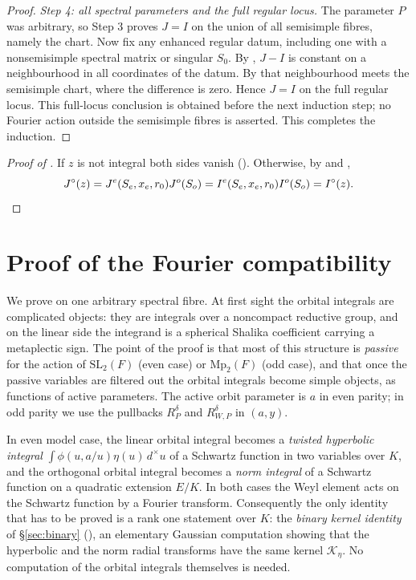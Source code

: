 \documentclass[11pt,oneside,notitlepage]{book}
\numberwithin{equation}{section}
\theoremstyle{plain}
\theoremstyle{definition}
\newcommand{\SL}{\mathrm{SL}}
\newcommand{\Mp}{\mathrm{Mp}}
\begin{document}
\begin{proof}
\emph{Step 4: all spectral parameters and the full regular locus.} The parameter $P$ was arbitrary, so Step 3 proves $J=I$ on the union of all semisimple fibres, namely the chart. Now fix any enhanced regular datum, including one with a nonsemisimple spectral matrix or singular $S_0$. By , $J-I$ is constant on a neighbourhood in all coordinates of the datum. By  that neighbourhood meets the semisimple chart, where the difference is zero. Hence $J=I$ on the full regular locus. This full-locus conclusion is obtained before the next induction step; no Fourier action outside the semisimple fibres is asserted. This completes the induction.
\end{proof}

\begin{proof}[Proof of ]
If $z$ is not integral both sides vanish (). Otherwise, by  and ,
\[J^\circ(z)=J^e(S_e,x_e,r_0)J^o(S_o)=I^e(S_e,x_e,r_0)I^o(S_o)=I^\circ(z).\qedhere\]
\end{proof}

\chapter{Proof of the Fourier compatibility}\label{ch:fourier}

We prove  on one arbitrary spectral fibre. At first sight the orbital integrals are complicated objects: they are integrals over a noncompact reductive group, and on the linear side the integrand is a spherical Shalika coefficient carrying a metaplectic sign. The point of the proof is that most of this structure is \emph{passive} for the action of $\SL_2(F)$ (even case) or $\Mp_2(F)$ (odd case), and that once the passive variables are filtered out the orbital integrals become simple objects, as functions of active parameters. The active orbit parameter is $a$ in even parity; in odd parity we use the pullbacks $R_P^\delta$ and $R_{W,P}^\delta$ in $(a,y)$. 

In even model case, the linear orbital integral becomes a \emph{twisted hyperbolic integral} $\int\phi(u,a/u)\eta(u)\,d^\times u$ of a Schwartz function in two variables over $K$, and the orthogonal orbital integral becomes a \emph{norm integral} of a Schwartz function on a quadratic extension $E/K$. In both cases the Weyl element acts on the Schwartz function by a Fourier transform. Consequently the only identity that has to be proved is a rank one statement over $K$: the \emph{binary kernel identity} of \S\ref{sec:binary} (), an elementary Gaussian computation showing that the hyperbolic and the norm radial transforms have the same kernel $\mathcal K_\eta$. No computation of the orbital integrals themselves is needed.
\end{document}
